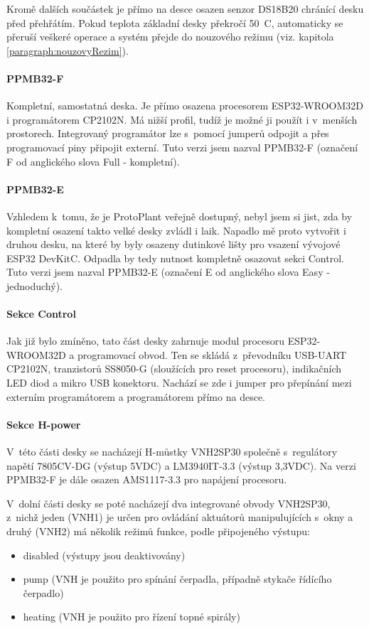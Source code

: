 Kromě dalších součástek je přímo na desce osazen senzor DS18B20 chránící desku před přehřátím. 
Pokud teplota základní desky překročí 50~\degree C, automaticky se přeruší veškeré operace a systém přejde do nouzového režimu (viz. kapitola \ref{paragraph:nouzovyRezim}).


\paragraph{PPMB32-F}
Kompletní, samostatná deska. 
Je přímo osazena procesorem ESP32-WROOM32D i programátorem CP2102N. 
Má nižší profil, tudíž je možné ji použít i v~menších prostorech.
Integrovaný programátor lze s~pomocí jumperů odpojit a přes programovací piny připojit externí. Tuto verzi jsem nazval PPMB32-F (označení F od anglického slova Full - kompletní).

\paragraph{PPMB32-E}
Vzhledem k~tomu, že je ProtoPlant veřejně dostupný, nebyl jsem si jist, zda by kompletní osazení takto velké desky zvládl i laik. 
Napadlo mě proto vytvořit i druhou desku, na které by byly osazeny dutinkové lišty pro vsazení vývojové ESP32 DevKitC. 
Odpadla by tedy nutnost kompletně osazovat sekci Control. 
Tuto verzi jsem nazval PPMB32-E (označení E od anglického slova Easy - jednoduchý).

\paragraph{Sekce Control}
Jak již bylo zmíněno, tato část desky zahrnuje modul procesoru ESP32-WROOM32D a programovací obvod. 
Ten se skládá z~převodníku USB-UART CP2102N, tranzistorů SS8050-G (sloužících pro reset procesoru), indikačních LED diod a mikro USB konektoru. 
Nachází se zde i jumper pro přepínání mezi externím programátorem a programátorem přímo na desce.

\paragraph{Sekce H-power}
V~této části desky se nacházejí H-můstky VNH2SP30 společně s~regulátory napětí 7805CV-DG (výstup 5VDC) a LM3940IT-3.3 (výstup 3,3VDC). 
Na verzi PPMB32-F je dále osazen AMS1117-3.3 pro napájení procesoru. 

V~dolní části desky se poté nacházejí dva integrované obvody VNH2SP30, z~nichž jeden (VNH1) je určen pro ovládání aktuátorů manipulujících s~okny a druhý 
(VNH2) má několik režimů funkce, podle připojeného výstupu:
\begin{itemize}
    \item disabled (výstupy jsou deaktivovány)
    \item pump (VNH je použito pro spínání čerpadla, případně stykače řídícího čerpadlo)
    \item heating (VNH je použito pro řízení topné spirály)
\end{itemize}

